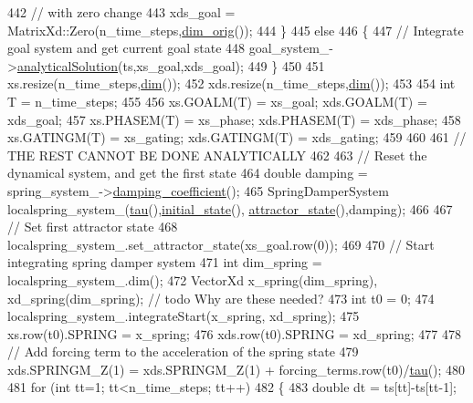 \begin{DoxyCode}
442     \textcolor{comment}{// with zero change}
443     xds\_goal = MatrixXd::Zero(n\_time\_steps,\hyperlink{group__DynamicalSystems_ga93d7cbbf2e471b00f124e41706405a05}{dim\_orig}());
444   \} 
445   \textcolor{keywordflow}{else}
446   \{
447     \textcolor{comment}{// Integrate goal system and get current goal state}
448     goal\_system\_->\hyperlink{classDmpBbo_1_1DynamicalSystem_ab6092038efc51ebd122e7c0878f6557d}{analyticalSolution}(ts,xs\_goal,xds\_goal);
449   \}
450 
451   xs.resize(n\_time\_steps,\hyperlink{group__DynamicalSystems_ga6f628f7f4ed9d77bf69f5b8560b98f18}{dim}());
452   xds.resize(n\_time\_steps,\hyperlink{group__DynamicalSystems_ga6f628f7f4ed9d77bf69f5b8560b98f18}{dim}());
453 
454   \textcolor{keywordtype}{int} T = n\_time\_steps;
455     
456   xs.GOALM(T) = xs\_goal;     xds.GOALM(T) = xds\_goal;
457   xs.PHASEM(T) = xs\_phase;   xds.PHASEM(T) = xds\_phase;
458   xs.GATINGM(T) = xs\_gating; xds.GATINGM(T) = xds\_gating;
459 
460   
461   \textcolor{comment}{// THE REST CANNOT BE DONE ANALYTICALLY}
462   
463   \textcolor{comment}{// Reset the dynamical system, and get the first state}
464   \textcolor{keywordtype}{double} damping = spring\_system\_->\hyperlink{classDmpBbo_1_1SpringDamperSystem_a1e0acb1d6298104e74f81f53768f5bf1}{damping\_coefficient}();
465   SpringDamperSystem localspring\_system\_(\hyperlink{group__DynamicalSystems_ga50eec7ad4c9664b5809ace45b22200d5}{tau}(),\hyperlink{group__DynamicalSystems_ga4c7f24e7deec1629548a075015bdc693}{initial\_state}(),
      \hyperlink{group__DynamicalSystems_gaebe3c462bc4a725cb17bcc3d13285f13}{attractor\_state}(),damping);
466   
467   \textcolor{comment}{// Set first attractor state}
468   localspring\_system\_.set\_attractor\_state(xs\_goal.row(0));
469   
470   \textcolor{comment}{// Start integrating spring damper system}
471   \textcolor{keywordtype}{int} dim\_spring = localspring\_system\_.dim();
472   VectorXd x\_spring(dim\_spring), xd\_spring(dim\_spring); \textcolor{comment}{// todo Why are these needed?}
473   \textcolor{keywordtype}{int} t0 = 0;
474   localspring\_system\_.integrateStart(x\_spring, xd\_spring);
475   xs.row(t0).SPRING  = x\_spring;
476   xds.row(t0).SPRING = xd\_spring;
477 
478   \textcolor{comment}{// Add forcing term to the acceleration of the spring state  }
479   xds.SPRINGM\_Z(1) = xds.SPRINGM\_Z(1) + forcing\_terms.row(t0)/\hyperlink{group__DynamicalSystems_ga50eec7ad4c9664b5809ace45b22200d5}{tau}();
480   
481   \textcolor{keywordflow}{for} (\textcolor{keywordtype}{int} tt=1; tt<n\_time\_steps; tt++)
482   \{
483     \textcolor{keywordtype}{double} dt = ts[tt]-ts[tt-1];

\end{DoxyCode}
